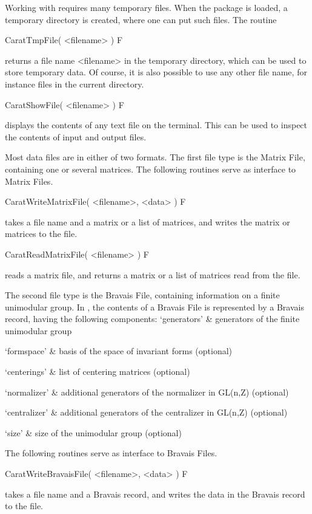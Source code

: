 Working with {\CARAT} requires many temporary files. When the {\CARAT}
package is loaded, a temporary directory is created, where one can
put such files. The routine

\>CaratTmpFile( <filename> ) F

returns a file name <filename> in the {\CARAT} temporary directory, which
can be used to store temporary data. Of course, it is also possible
to use any other file name, for instance files in the current directory.

\>CaratShowFile( <filename> ) F

displays the contents of any text file on the terminal. This can be
used to inspect the contents of {\CARAT} input and output files.

Most {\CARAT} data files are in either of two formats. The first {\CARAT}
file type is the Matrix File, containing one or several matrices.
The following routines serve as interface to {\CARAT} Matrix Files.

\>CaratWriteMatrixFile( <filename>, <data> ) F

takes a file name and a matrix or a list of matrices, and writes the
matrix or matrices to the file.

\>CaratReadMatrixFile( <filename> ) F

reads a {\CARAT} matrix file, and returns a matrix or a list of matrices
read from the file.

The second {\CARAT} file type is the Bravais File, containing information
on a finite unimodular group. In { \GAP}, the contents of a Bravais File 
is represented by a Bravais record, having the following components:
\beginitems
`generators'   & generators of the finite unimodular group

`formspace'    & basis of the space of invariant forms (optional)

`centerings'   & list of centering matrices (optional)

`normalizer'   & additional generators of the normalizer in GL(n,Z) (optional)

`centralizer'  & additional generators of the centralizer in GL(n,Z) (optional)

`size'         & size of the unimodular group (optional)
\enditems

The following routines serve as interface to {\CARAT} Bravais Files.

\>CaratWriteBravaisFile( <filename>, <data> ) F

takes a file name and a Bravais record, and writes the data in the
Bravais record to the file.

